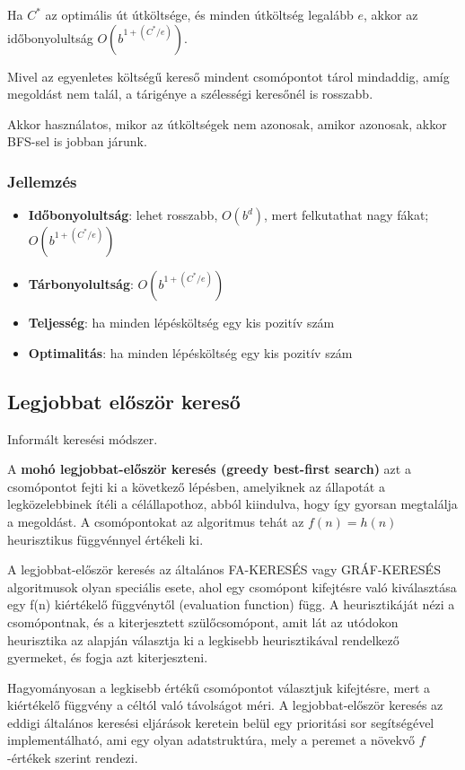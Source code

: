 Ha $C^*$ az optimális út útköltsége, és minden útköltség legalább $e$,
akkor az időbonyolultság $O(b^{1+(C^*/e)})$.

Mivel az egyenletes költségű kereső mindent csomópontot tárol mindaddig,
amíg megoldást nem talál, a tárigénye a szélességi keresőnél is rosszabb.

Akkor használatos, mikor az útköltségek nem azonosak, amikor azonosak, akkor
BFS-sel is jobban járunk.

\subsubsection{Jellemzés}

\begin{itemize}
    \item {\bf Időbonyolultság}: lehet rosszabb, $O(b^d)$, mert felkutathat
        nagy fákat; $O(b^{1+(C^*/e)})$
    \item {\bf Tárbonyolultság}: $O(b^{1+(C^*/e)})$
    \item {\bf Teljesség}: ha minden lépésköltség egy kis pozitív szám
    \item {\bf Optimalitás}: ha minden lépésköltség egy kis pozitív szám
\end{itemize}

\subsection{Legjobbat először kereső}

Informált keresési módszer.

A {\bf mohó legjobbat-először keresés (greedy best-first search)} azt a
csomópontot fejti ki a következő lépésben, amelyiknek az állapotát a
legközelebbinek ítéli a célállapothoz, abból kiindulva, hogy így gyorsan
megtalálja a megoldást. A csomópontokat az algoritmus tehát az $f(n) = h(n)$
heurisztikus függvénnyel értékeli ki.

A legjobbat-először keresés az általános FA-KERESÉS vagy GRÁF-KERESÉS
algoritmusok olyan speciális esete, ahol egy csomópont kifejtésre való
kiválasztása egy f(n) kiértékelő függvénytől (evaluation function) függ. A
heurisztikáját nézi a csomópontnak, és a kiterjesztett szülőcsomópont, amit lát
az utódokon heurisztika az alapján választja ki a legkisebb heurisztikával
rendelkező gyermeket, és fogja azt kiterjeszteni.

Hagyományosan a legkisebb értékű csomópontot választjuk kifejtésre, mert a
kiértékelő függvény a céltól való távolságot méri.  A legjobbat-először keresés
az eddigi általános keresési eljárások keretein belül egy prioritási sor
segítségével implementálható, ami egy olyan adatstruktúra, mely a peremet a
növekvő $f$-értékek szerint rendezi.

